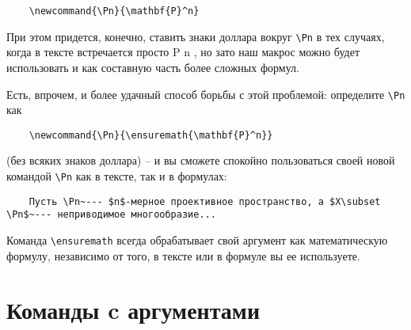 \begin{verbatim}
	\newcommand{\Pn}{\mathbf{P}^n}
\end{verbatim}

При этом придется, конечно, ставить знаки доллара вокруг \verb"\Pn" в тех случаях, когда в тексте встречается просто P n , но зато наш макрос можно будет использовать и как составную часть более сложных формул.

Есть, впрочем, и более удачный способ борьбы с этой проблемой: определите \verb"\Pn" как

\begin{verbatim}
	\newcommand{\Pn}{\ensuremath{\mathbf{P}^n}}
\end{verbatim}

(без всяких знаков доллара) -- и вы сможете спокойно пользоваться своей новой командой \verb"\Pn" как в тексте, так и в формулах:

\begin{verbatim}
	Пусть \Pn~--- $n$-мерное проективное пространство, а $X\subset \Pn$~--- неприводимое многообразие...
\end{verbatim}

Команда \verb"\ensuremath" всегда обрабатывает свой аргумент как математическую формулу, независимо от того, в тексте или в формуле вы ее используете.

\section{Команды c аргументами}